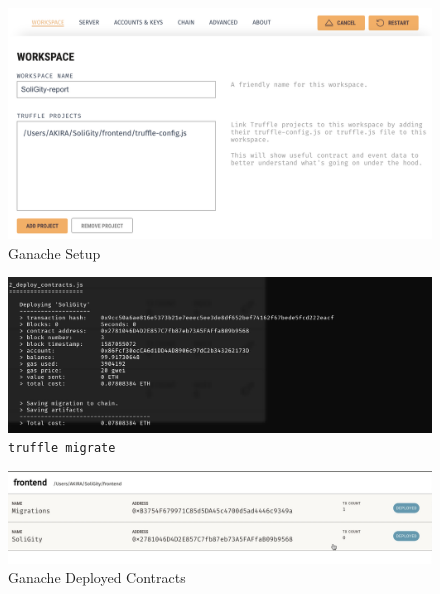 \documentclass[12pt]{article}
\renewcommand{\_}{\kern-1.5pt\textunderscore\kern-1.5pt}
\begin{document}
\begin{figure}[H]
	\centering
	\includegraphics[width=13cm]{graphs/06. ganache_setup}
	\caption{Ganache Setup}
\end{figure}

\begin{figure}[H]
	\centering
	\includegraphics[width=13cm]{graphs/07. truffle_migrate}
	\caption{\texttt{truffle migrate}}
\end{figure}

\begin{figure}[H]
	\centering
	\includegraphics[width=13cm]{graphs/08. ganache_deployed_contract}
	\caption{Ganache Deployed Contracts}
\end{figure}





\end{document}

